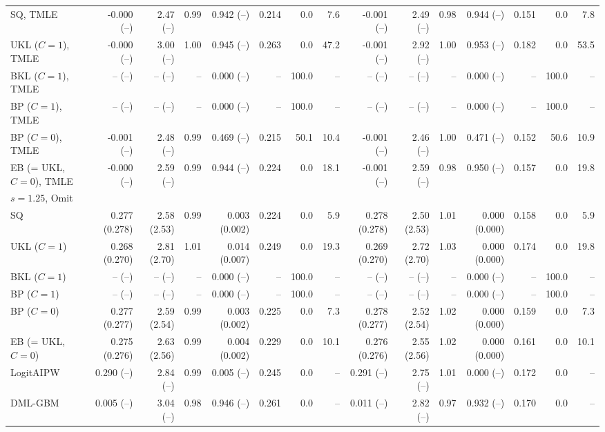 \begin{tabular}{lrrrrrrrrrrrrrr}
SQ, TMLE & -0.000 (--) & 2.47 (--) & 0.99 & 0.942 (--) & 0.214 & 0.0 & 7.6 & -0.001 (--) & 2.49 (--) & 0.98 & 0.944 (--) & 0.151 & 0.0 & 7.8 \\
UKL ($C=1$), TMLE & -0.000 (--) & 3.00 (--) & 1.00 & 0.945 (--) & 0.263 & 0.0 & 47.2 & -0.001 (--) & 2.92 (--) & 1.00 & 0.953 (--) & 0.182 & 0.0 & 53.5 \\
BKL ($C=1$), TMLE & -- (--) & -- (--) & -- & 0.000 (--) & -- & 100.0 & -- & -- (--) & -- (--) & -- & 0.000 (--) & -- & 100.0 & -- \\
BP ($C=1$), TMLE & -- (--) & -- (--) & -- & 0.000 (--) & -- & 100.0 & -- & -- (--) & -- (--) & -- & 0.000 (--) & -- & 100.0 & -- \\
BP ($C=0$), TMLE & -0.001 (--) & 2.48 (--) & 0.99 & 0.469 (--) & 0.215 & 50.1 & 10.4 & -0.001 (--) & 2.46 (--) & 1.00 & 0.471 (--) & 0.152 & 50.6 & 10.9 \\
EB (= UKL, $C=0$), TMLE & -0.000 (--) & 2.59 (--) & 0.99 & 0.944 (--) & 0.224 & 0.0 & 18.1 & -0.001 (--) & 2.59 (--) & 0.98 & 0.950 (--) & 0.157 & 0.0 & 19.8 \\
\multicolumn{15}{l}{$s=1.25$, Omit} \\
SQ & 0.277 (0.278) & 2.58 (2.53) & 0.99 & 0.003 (0.002) & 0.224 & 0.0 & 5.9 & 0.278 (0.278) & 2.50 (2.53) & 1.01 & 0.000 (0.000) & 0.158 & 0.0 & 5.9 \\
UKL ($C=1$) & 0.268 (0.270) & 2.81 (2.70) & 1.01 & 0.014 (0.007) & 0.249 & 0.0 & 19.3 & 0.269 (0.270) & 2.72 (2.70) & 1.03 & 0.000 (0.000) & 0.174 & 0.0 & 19.8 \\
BKL ($C=1$) & -- (--) & -- (--) & -- & 0.000 (--) & -- & 100.0 & -- & -- (--) & -- (--) & -- & 0.000 (--) & -- & 100.0 & -- \\
BP ($C=1$) & -- (--) & -- (--) & -- & 0.000 (--) & -- & 100.0 & -- & -- (--) & -- (--) & -- & 0.000 (--) & -- & 100.0 & -- \\
BP ($C=0$) & 0.277 (0.277) & 2.59 (2.54) & 0.99 & 0.003 (0.002) & 0.225 & 0.0 & 7.3 & 0.278 (0.277) & 2.52 (2.54) & 1.02 & 0.000 (0.000) & 0.159 & 0.0 & 7.3 \\
EB (= UKL, $C=0$) & 0.275 (0.276) & 2.63 (2.56) & 0.99 & 0.004 (0.002) & 0.229 & 0.0 & 10.1 & 0.276 (0.276) & 2.55 (2.56) & 1.02 & 0.000 (0.000) & 0.161 & 0.0 & 10.1 \\
LogitAIPW & 0.290 (--) & 2.84 (--) & 0.99 & 0.005 (--) & 0.245 & 0.0 & -- & 0.291 (--) & 2.75 (--) & 1.01 & 0.000 (--) & 0.172 & 0.0 & -- \\
DML-GBM & 0.005 (--) & 3.04 (--) & 0.98 & 0.946 (--) & 0.261 & 0.0 & -- & 0.011 (--) & 2.82 (--) & 0.97 & 0.932 (--) & 0.170 & 0.0 & -- \\

\end{tabular}
